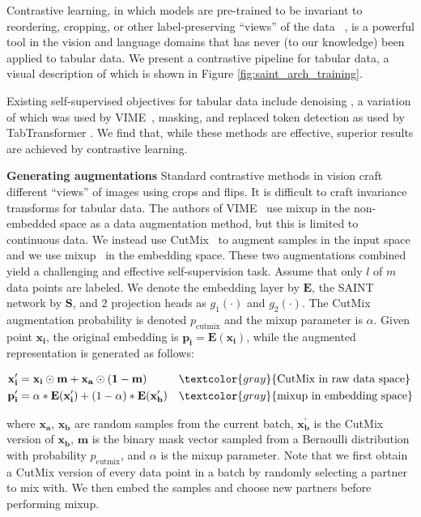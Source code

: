 Contrastive learning, in which models are pre-trained to be invariant to reordering, cropping, or other label-preserving ``views'' of the data~ \cite{chen2020simple,he2020momentum,pathak2016context,grill2020bootstrap,vincent2008extracting}, is a powerful tool in the vision and language domains that has never (to our knowledge) been applied to tabular data. We present a contrastive pipeline for tabular data, a visual description of which is shown in Figure \ref{fig:saint_arch_training}.

Existing self-supervised objectives for tabular data include denoising \citep{vincent2008extracting}, a variation of which was used by VIME~\citep{yoon2020vime}, masking, and replaced token detection as used by TabTransformer \citep{huang2020tabtransformer}. We find that, while these methods are effective, superior results are achieved by contrastive learning.

\textbf{Generating augmentations} Standard contrastive methods in vision craft different ``views'' of images using crops and flips. It is difficult to craft invariance transforms for tabular data. The authors of VIME~\citep{yoon2020vime} use mixup in the non-embedded space as a data augmentation method, but this is limited to continuous data. We instead use CutMix~\citep{yun2019cutmix} to augment samples in the input space and we use mixup~\citep{zhang2017mixup} in the embedding space. These two augmentations combined yield a challenging and effective self-supervision task. Assume that only $l$ of $m$ data points are labeled.  We denote the embedding layer by $\mathbf{E}$, the SAINT network by $\mathbf{S}$, and 2 projection heads as $g_1(\cdot)$ and $g_2(\cdot)$. The CutMix augmentation probability is denoted $p_{\text{cutmix}}$ and the mixup parameter is $\alpha$.
Given point $\mathbf{x_i}$, the original embedding is $\mathbf{p_i} = \mathbf{E}(\mathbf{x_i})$, while the augmented representation is generated as follows:

\begin{align}
\mathbf{x_i^\prime} &= \mathbf{x_i}\odot \mathbf{m} + \mathbf{x_a}\odot \mathbf{(1-m)} && \textcolor{gray}{\text{CutMix in raw data space}}\\
\mathbf{p_i^\prime} &= \alpha*\mathbf{E}(\mathbf{x_i^\prime}) +(1-\alpha)*\mathbf{E}(\mathbf{x_b^\prime})&& \textcolor{gray}{\text{mixup in embedding space}}
\end{align}

where $\mathbf{x_a}$, $\mathbf{x_b}$ are random samples from the current batch, $\mathbf{x_b^\prime}$ is the CutMix version of $\mathbf{x_b}$, $\mathbf{m}$ is the binary mask vector sampled from a Bernoulli distribution with probability $p_{\text{cutmix}}$, and $\alpha$ is the mixup parameter. Note that we first obtain a CutMix version of every data point in a batch by randomly selecting a partner to mix with. We then embed the samples and choose new partners before performing mixup. 

